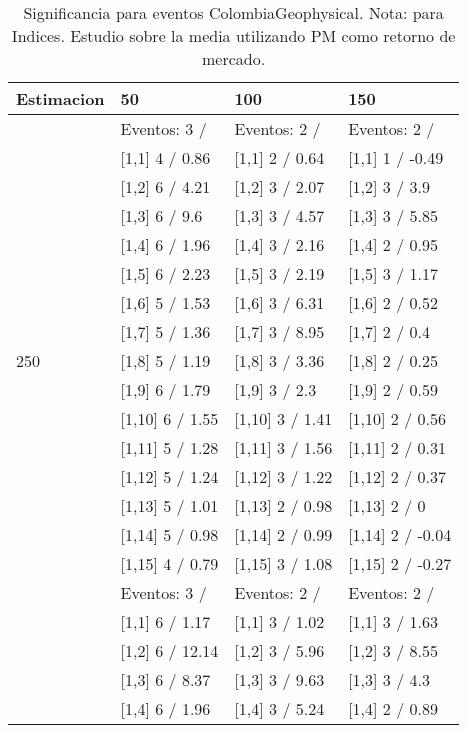 \begin{table}

\caption{Significancia para eventos ColombiaGeophysical. Nota: para Indices. Estudio sobre la media utilizando PM como retorno de mercado.}
\centering
\begin{tabular}[t]{llll}
\toprule
Estimacion & 50 & 100 & 150\\
\midrule
 & Eventos:  3 / & Eventos:  2 / & Eventos:  2 /\\
 & {}[1,1] 4  / 0.86 & {}[1,1] 2  / 0.64 & {}[1,1] 1  / -0.49\\
 & {}[1,2] 6  / 4.21 & {}[1,2] 3  / 2.07 & {}[1,2] 3  / 3.9\\
 & {}[1,3] 6  / 9.6 & {}[1,3] 3  / 4.57 & {}[1,3] 3  / 5.85\\
 & {}[1,4] 6  / 1.96 & {}[1,4] 3  / 2.16 & {}[1,4] 2  / 0.95\\
\addlinespace
 & {}[1,5] 6  / 2.23 & {}[1,5] 3  / 2.19 & {}[1,5] 3  / 1.17\\
 & {}[1,6] 5  / 1.53 & {}[1,6] 3  / 6.31 & {}[1,6] 2  / 0.52\\
 & {}[1,7] 5  / 1.36 & {}[1,7] 3  / 8.95 & {}[1,7] 2  / 0.4\\
250 & {}[1,8] 5  / 1.19 & {}[1,8] 3  / 3.36 & {}[1,8] 2  / 0.25\\
 & {}[1,9] 6  / 1.79 & {}[1,9] 3  / 2.3 & {}[1,9] 2  / 0.59\\
\addlinespace
 & {}[1,10] 6  / 1.55 & {}[1,10] 3  / 1.41 & {}[1,10] 2  / 0.56\\
 & {}[1,11] 5  / 1.28 & {}[1,11] 3  / 1.56 & {}[1,11] 2  / 0.31\\
 & {}[1,12] 5  / 1.24 & {}[1,12] 3  / 1.22 & {}[1,12] 2  / 0.37\\
 & {}[1,13] 5  / 1.01 & {}[1,13] 2  / 0.98 & {}[1,13] 2  / 0\\
 & {}[1,14] 5  / 0.98 & {}[1,14] 2  / 0.99 & {}[1,14] 2  / -0.04\\
\addlinespace
 & {}[1,15] 4  / 0.79 & {}[1,15] 3  / 1.08 & {}[1,15] 2  / -0.27\\
 & Eventos:  3 / & Eventos:  2 / & Eventos:  2 /\\
 & {}[1,1] 6  / 1.17 & {}[1,1] 3  / 1.02 & {}[1,1] 3  / 1.63\\
 & {}[1,2] 6  / 12.14 & {}[1,2] 3  / 5.96 & {}[1,2] 3  / 8.55\\
 & {}[1,3] 6  / 8.37 & {}[1,3] 3  / 9.63 & {}[1,3] 3  / 4.3\\
\addlinespace
 & {}[1,4] 6  / 1.96 & {}[1,4] 3  / 5.24 & {}[1,4] 2  / 0.89\\

\end{tabular}
\end{table}
